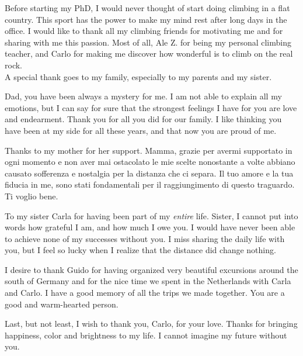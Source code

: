 Before starting my PhD, I would never thought of start doing climbing in a flat country. This sport has the power to make my mind rest after long days in the office.
I would like to thank all my climbing friends for motivating me and for sharing with me this passion. Most of all, Ale Z. for being my personal climbing teacher, and Carlo for making me discover how wonderful is to climb on the real rock.\\ 

A special thank goes to my family, especially to my parents and my sister.

Dad, you have been always a mystery for me. I am not able to explain all my emotions, but I can say for sure that the strongest feelings I have for you are love and endearment. Thank you for all you did for our family. I like thinking you have been at my side for all these years, and that now you are proud of me.

Thanks to my mother for her support. Mamma, grazie per avermi supportato in ogni momento e non aver mai ostacolato le mie scelte nonostante a volte abbiano causato sofferenza e nostalgia per la distanza che ci separa. Il tuo amore e la tua fiducia in me, sono stati fondamentali per il raggiungimento di questo traguardo. Ti voglio bene.   

To my sister Carla for having been part of my \textit{entire} life. Sister, I cannot put into words how grateful I am, and how much I owe you. I would have never been able to achieve none of my successes without you.
I miss sharing the daily life with you, but I feel so lucky when I realize that the distance did change nothing. 

I desire to thank Guido for having organized very beautiful excursions around the south of Germany and for the nice time we spent in the Netherlands with Carla and Carlo. I have a good memory of all the trips we made together. You are a good and warm-hearted person.

Last, but not least, I wish to thank you, Carlo, for your love. 
Thanks for bringing happiness, color and brightness to my life. I cannot imagine my future without you.
